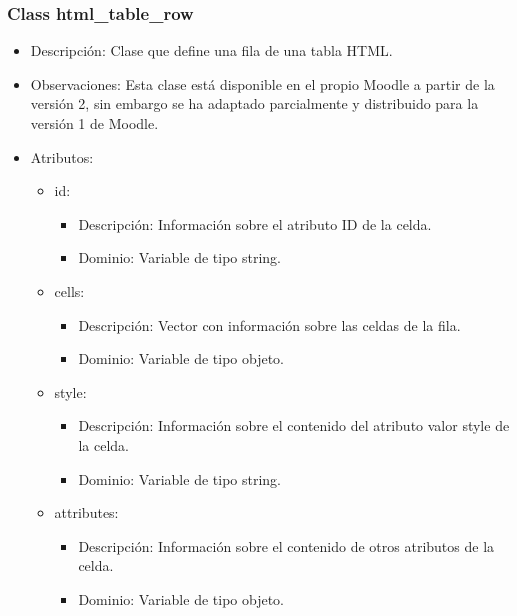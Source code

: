 \subsubsection{Class html\_table\_row}

\begin{itemize}
	\item Descripción: Clase que define una fila de una tabla HTML.
	\item Observaciones: Esta clase está disponible en el propio Moodle a partir de la versión 2, sin embargo se ha adaptado parcialmente y distribuido para la versión 1 de Moodle.
	\item Atributos:
		\begin{itemize}
			\item id:
				\begin{itemize}
					\item Descripción: Información sobre el atributo ID de la celda.
					\item Dominio: Variable de tipo string.
				\end{itemize}
		\end{itemize}
		\begin{itemize}
			\item cells:
				\begin{itemize}
					\item Descripción: Vector con información sobre las celdas de la fila.
					\item Dominio: Variable de tipo objeto.
				\end{itemize}
		\end{itemize}
		\begin{itemize}
			\item style:
				\begin{itemize}
					\item Descripción: Información sobre el contenido del atributo valor style de la celda.
					\item Dominio: Variable de tipo string.
				\end{itemize}
		\end{itemize}
		\begin{itemize}
			\item attributes:
				\begin{itemize}
					\item Descripción: Información sobre el contenido de otros atributos de la celda.
					\item Dominio: Variable de tipo objeto.
				\end{itemize}

\end{itemize}
\end{itemize}
